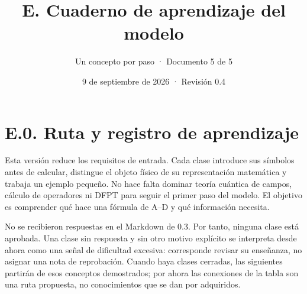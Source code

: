 \documentclass[
  spanish,
  10pt,
  a4paper,
]{article}
\title{E. Cuaderno de aprendizaje del modelo}
\subtitle{Un concepto por paso · Documento 5 de 5}
\author{}
\date{9 de septiembre de 2026 · Revisión 0.4}
\begin{document}
\maketitle

{
\setcounter{tocdepth}{2}
\tableofcontents
}
\newpage

\setlength{\parskip}{4pt plus 1pt}

\section{E.0. Ruta y registro de
aprendizaje}\label{e.0.-ruta-y-registro-de-aprendizaje}

Esta versión reduce los requisitos de entrada. Cada clase introduce sus
símbolos antes de calcular, distingue el objeto físico de su
representación matemática y trabaja un ejemplo pequeño. No hace falta
dominar teoría cuántica de campos, cálculo de operadores ni DFPT para
seguir el primer paso del modelo. El objetivo es comprender qué hace una
fórmula de A--D y qué información necesita.

No se recibieron respuestas en el Markdown de 0.3. Por tanto, ninguna
clase está aprobada. Una clase sin respuesta y sin otro motivo explícito
se interpreta desde ahora como una señal de dificultad excesiva:
corresponde revisar su enseñanza, no asignar una nota de reprobación.
Cuando haya clases cerradas, las siguientes partirán de esos conceptos
demostrados; por ahora las conexiones de la tabla son una ruta
propuesta, no conocimientos que se dan por adquiridos.
\end{document}
